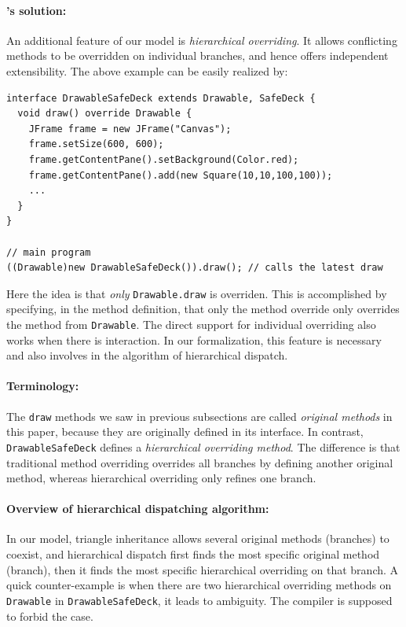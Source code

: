 \paragraph{\MIM{}'s solution:} An additional feature of our model is \textit{hierarchical overriding}. It allows conflicting methods
to be overridden on individual branches, and hence offers independent extensibility. The above example can be easily realized by:
\vspace{3pt}\begin{lstlisting}
interface DrawableSafeDeck extends Drawable, SafeDeck {
  void draw() override Drawable {
    JFrame frame = new JFrame("Canvas");
    frame.setSize(600, 600);
    frame.getContentPane().setBackground(Color.red);
    frame.getContentPane().add(new Square(10,10,100,100));
    ...
  }
}

// main program
((Drawable)new DrawableSafeDeck()).draw(); // calls the latest draw
\end{lstlisting}\vspace{3pt}
Here the idea is that \emph{only} \lstinline{Drawable.draw} is
overriden. This is accomplished by specifying, in the method
definition, that only the method override only overrides the method 
from \lstinline|Drawable|.  
The direct support for individual overriding also works when there is interaction. In our formalization, this feature is necessary
and also involves in the algorithm of hierarchical dispatch.

\paragraph{Terminology:} The \lstinline|draw| methods we saw in
previous subsections are called \textit{original methods} in this paper, because they are originally defined in its interface.
In contrast, \lstinline|DrawableSafeDeck| defines a \textit{hierarchical overriding method}. The difference is that traditional method overriding overrides all branches by defining another original method, whereas hierarchical overriding only refines one branch.

\paragraph{Overview of hierarchical dispatching algorithm:} In our
model, triangle inheritance allows several original methods (branches)
to coexist, and hierarchical dispatch first finds the most specific
original method (branch), then it finds the most specific hierarchical
overriding on that branch. A quick counter-example is when there are
two hierarchical overriding methods on \lstinline|Drawable| in
\lstinline|DrawableSafeDeck|, it leads to ambiguity. The compiler is
supposed to forbid the case.


